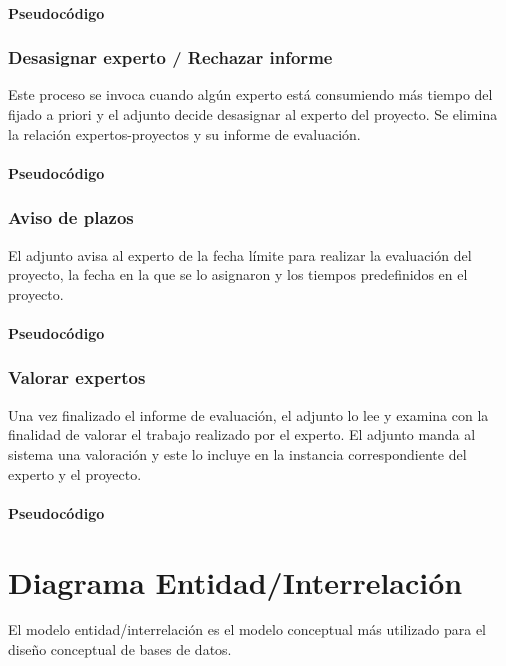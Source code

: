 \documentclass[12pt,a4paper,titlepage,spanish,twoside]{book}
\begin{document}
\subsubsection{Pseudocódigo}


\subsection{Desasignar experto / Rechazar informe}
Este proceso se invoca cuando algún experto está consumiendo más tiempo del 
fijado a priori y el adjunto decide desasignar al experto del proyecto. Se 
elimina la relación expertos-proyectos y su informe de evaluación.

\subsubsection{Pseudocódigo}


\subsection{Aviso de plazos}
El adjunto avisa al experto de la fecha límite para realizar la evaluación del 
proyecto, la fecha en la que se lo asignaron y los tiempos predefinidos en el 
proyecto.

\subsubsection{Pseudocódigo}


\subsection{Valorar expertos}
Una vez finalizado el informe de evaluación, el adjunto lo lee y examina con la 
finalidad de valorar el trabajo realizado por el experto. El adjunto manda al
sistema una valoración y este lo incluye en la instancia correspondiente del 
experto y el proyecto.

\subsubsection{Pseudocódigo}


\chapter{Diagrama Entidad/Interrelación}
El modelo entidad/interrelación es el modelo conceptual más utilizado para el 
diseño conceptual de bases de datos.
\end{document}
